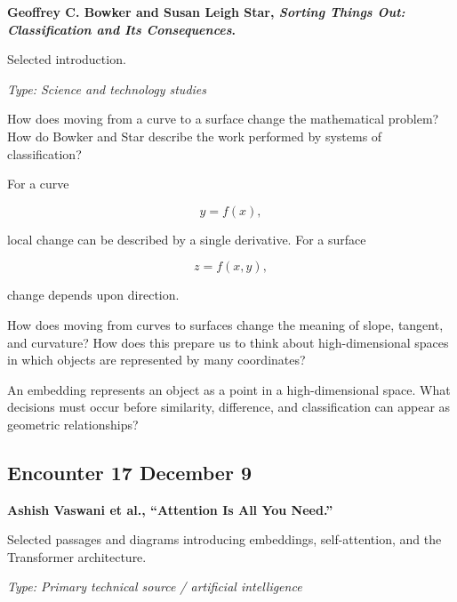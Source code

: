 \medskip

\textbf{Geoffrey C. Bowker and Susan Leigh Star,
\emph{Sorting Things Out: Classification and Its Consequences}.}

Selected introduction. \parencite{bowkerstar1999}

\textit{Type: Science and technology studies}

\begin{description}[leftmargin=1.15in,style=nextline]

\item[\textcolor{LangRed}{READ}]
How does moving from a curve to a surface change the mathematical
problem? How do Bowker and Star describe the work performed by
systems of classification?

\item[\textcolor{LangRed}{CONNECT}]
For a curve

\[
y=f(x),
\]

local change can be described by a single derivative. For a surface

\[
z=f(x,y),
\]

change depends upon direction.

How does moving from curves to surfaces change the meaning of slope,
tangent, and curvature? How does this prepare us to think about
high-dimensional spaces in which objects are represented by many
coordinates?

\item[\textcolor{LangRed}{QUESTION}]
An embedding represents an object as a point in a high-dimensional
space. What decisions must occur before similarity, difference, and
classification can appear as geometric relationships?

\end{description}

\subsection*{Encounter 17 \hfill December 9}


\textbf{Ashish Vaswani et al.,
``Attention Is All You Need.''}

Selected passages and diagrams introducing embeddings,
self-attention, and the Transformer architecture.

\textit{Type: Primary technical source / artificial intelligence}

